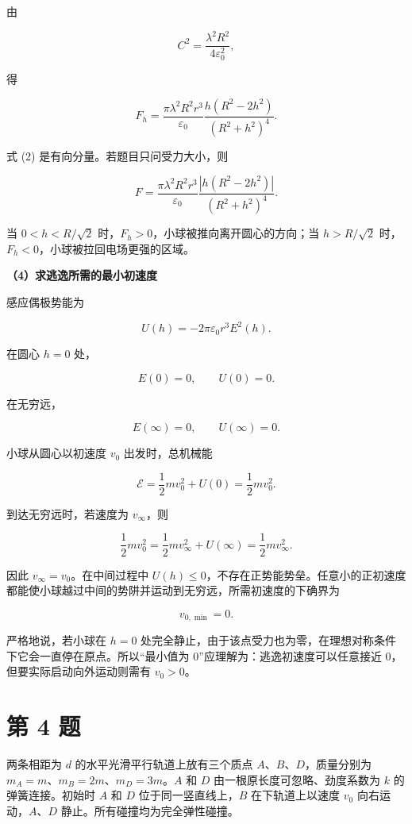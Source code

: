 \documentclass[12pt,a4paper,UTF8]{ctexart}
\begin{document}
由

\[
C^2=\frac{\lambda^2R^2}{4\varepsilon_0^2},
\]

得

\[
\boxed{
F_h=
\frac{\pi\lambda^2R^2r^3}{\varepsilon_0}
\frac{h(R^2-2h^2)}{(R^2+h^2)^4}
}. \tag{2}
\]

式 (2) 是有向分量。若题目只问受力大小，则

\[
\boxed{
F=
\frac{\pi\lambda^2R^2r^3}{\varepsilon_0}
\frac{|h(R^2-2h^2)|}{(R^2+h^2)^4}
}.
\]

当 \(0<h<R/\sqrt2\) 时，\(F_h>0\)，小球被推向离开圆心的方向；当
\(h>R/\sqrt2\) 时，\(F_h<0\)，小球被拉回电场更强的区域。

\textbf{（4）求逃逸所需的最小初速度}

感应偶极势能为

\[
U(h)=-2\pi\varepsilon_0r^3E^2(h).
\]

在圆心 \(h=0\) 处，

\[E(0)=0,
\qquad U(0)=0.
\]

在无穷远，

\[E(\infty)=0,
\qquad U(\infty)=0.
\]

小球从圆心以初速度 \(v_0\) 出发时，总机械能

\[
\mathcal E=\frac12mv_0^2+U(0)=\frac12mv_0^2.
\]

到达无穷远时，若速度为 \(v_\infty\)，则

\[
\frac12mv_0^2
=\frac12mv_\infty^2+U(\infty)
=\frac12mv_\infty^2.
\]

因此 \(v_\infty=v_0\)。在中间过程中
\(U(h)\le0\)，不存在正势能势垒。任意小的正初速度都能使小球越过中间的势阱并运动到无穷远，所需初速度的下确界为

\[
\boxed{v_{0,\min}=0}.
\]

严格地说，若小球在 \(h=0\)
处完全静止，由于该点受力也为零，在理想对称条件下它会一直停在原点。所以``最小值为
0''应理解为：逃逸初速度可以任意接近 0，但要实际启动向外运动则需有
\(v_0>0\)。

\newpage

\section{第 4 题}\label{ux7b2c-4-ux9898}

两条相距为 \(d\) 的水平光滑平行轨道上放有三个质点
\(A\)、\(B\)、\(D\)，质量分别为 \(m_A=m\)、\(m_B=2m\)、\(m_D=3m\)。\(A\)
和 \(D\) 由一根原长度可忽略、劲度系数为 \(k\) 的弹簧连接。初始时 \(A\)
和 \(D\) 位于同一竖直线上，\(B\) 在下轨道上以速度 \(v_0\)
向右运动，\(A\)、\(D\) 静止。所有碰撞均为完全弹性碰撞。
\end{document}
